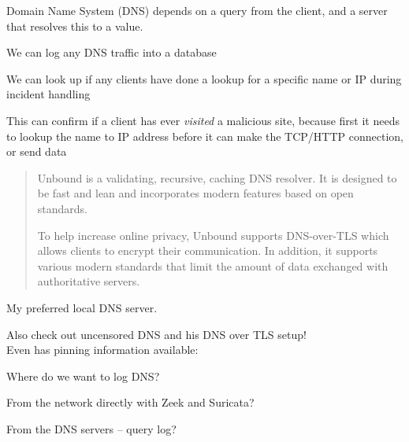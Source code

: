\documentclass[Screen16to9,17pt]{foils}
\begin{document}
Domain Name System (DNS) depends on a query from the client, and a server that resolves this to a value.

\begin{list2}
\item We can log any DNS traffic into a database
\item We can look up if any clients have done a lookup for a specific name or IP during incident handling
\item This can confirm if a client has ever \emph{visited} a malicious site, because first it needs to lookup the name to IP address before it can make the TCP/HTTP connection, or send data
\end{list2}





\begin{quote}
Unbound is a validating, recursive, caching DNS resolver. It is designed to be fast and lean and incorporates modern features based on open standards.

To help increase online privacy, Unbound supports DNS-over-TLS which allows clients to encrypt their communication. In addition, it supports various modern standards that limit the amount of data exchanged with authoritative servers.
\end{quote}


My preferred local DNS server.

Also check out uncensored DNS and his DNS over TLS setup!\\
Even has pinning information available:\\ {\small{}}







Where do we want to log DNS?

From the network directly with Zeek and Suricata?


From the DNS servers -- query log?




\end{document}
